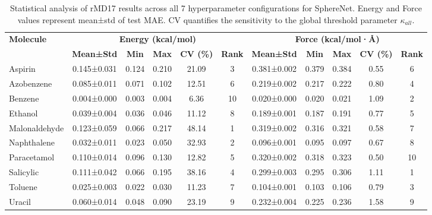 \begin{table}[!htb]
  \scriptsize
  \centering
  \caption{Statistical analysis of rMD17 results across all 7 hyperparameter configurations for SphereNet. Energy and Force values represent mean±std of test MAE. CV quantifies the sensitivity to the global threshold parameter $\kappa_{all}$.}
  \label{tab:supp_rmd17_stats}
    \begin{tabular}{lcccccccccc}
    \toprule
    \multirow{2}{*}{\textbf{Molecule}} & \multicolumn{5}{c}{\textbf{Energy (kcal/mol)}} & \multicolumn{5}{c}{\textbf{Force (kcal/mol·\r{A})}} \\
    \cmidrule(lr){2-6} \cmidrule(lr){7-11}
    & \textbf{Mean±Std} & \textbf{Min} & \textbf{Max} & \textbf{CV (\%)} & \textbf{Rank} & \textbf{Mean±Std} & \textbf{Min} & \textbf{Max} & \textbf{CV (\%)} & \textbf{Rank} \\
    \midrule
    Aspirin & 0.145±0.031 & 0.124 & 0.210 & 21.09 & 3 & 0.381±0.002 & 0.379 & 0.384 & 0.55 & 6 \\
    Azobenzene & 0.085±0.011 & 0.071 & 0.102 & 12.51 & 6 & 0.219±0.002 & 0.217 & 0.222 & 0.80 & 4 \\
    Benzene & 0.004±0.000 & 0.003 & 0.004 & 6.36 & 10 & 0.020±0.000 & 0.020 & 0.021 & 1.09 & 2 \\
    Ethanol & 0.039±0.004 & 0.036 & 0.046 & 11.12 & 8 & 0.189±0.001 & 0.187 & 0.191 & 0.77 & 5 \\
    Malonaldehyde & 0.123±0.059 & 0.066 & 0.217 & 48.14 & 1 & 0.319±0.002 & 0.316 & 0.321 & 0.58 & 7 \\
    Naphthalene & 0.032±0.011 & 0.023 & 0.050 & 32.93 & 2 & 0.096±0.001 & 0.095 & 0.097 & 0.67 & 8 \\
    Paracetamol & 0.110±0.014 & 0.096 & 0.130 & 12.82 & 5 & 0.320±0.002 & 0.318 & 0.323 & 0.50 & 10 \\
    Salicylic & 0.111±0.042 & 0.066 & 0.195 & 38.16 & 4 & 0.299±0.003 & 0.295 & 0.306 & 1.11 & 1 \\
    Toluene & 0.025±0.003 & 0.022 & 0.030 & 11.23 & 7 & 0.104±0.001 & 0.103 & 0.106 & 0.79 & 3 \\
    Uracil & 0.060±0.014 & 0.048 & 0.090 & 23.19 & 9 & 0.232±0.004 & 0.225 & 0.236 & 1.58 & 9 \\
    \bottomrule
    \end{tabular}
\end{table}

